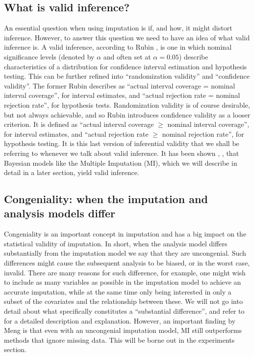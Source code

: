 \documentclass{article}
\begin{document}
	\subsection{What is valid inference?}
	An essential question when using imputation is if, and how, it might distort inference. However, to answer this question we need to have an idea of what valid inference is. A valid inference, according to Rubin \cite{rubin_multiple_1996}, is one in which nominal significance levels (denoted by $\alpha$ and often set at $\alpha = 0.05$) describe characteristics of a distribution for confidence interval estimation and hypothesis testing. This can be further refined into \enquote{randomization validity} and \enquote{confidence validity}. The former Rubin describes as \enquote{actual interval coverage = nominal interval coverage}, for interval estimates, and  \enquote{actual rejection rate = nominal rejection rate}, for hypothesis tests. Randomization validity is of course desirable, but not always achievable, and so Rubin introduces confidence validity as a looser criterion. It is defined as \enquote{actual interval coverage $\geq$ nominal interval coverage}, for interval estimates, and \enquote{actual rejection rate $\geq$ nominal rejection rate}, for hypothesis testing. It is this last version of inferential validity that we shall be referring to whenever we talk about valid inference. It has been shown \cite{Xie2017}, \cite{Meng1994}, \cite{rubin_multiple_1996} that Bayesian models like the Multiple Imputation (MI), which we will describe in detail in a later section, yield valid inference.
	
	\subsection{Congeniality: when the imputation and analysis models differ}
	Congeniality is an important concept in imputation and has a big impact on the statistical validity of imputation. In short, when the analysis model differs substantially from the imputation model we say that they are uncongenial. Such differences might cause the subsequent analysis to be biased, or in the worst case, invalid. There are many reasons for such difference, for example, one might wish to include as many variables as possible in the imputation model to achieve an accurate imputation, while at the same time only being interested in only a subset of the covariates and the relationship between these. We will not go into detail about what specifically constitutes a \enquote{substantial difference}, and refer to \cite{Meng1994} for a detailed description and explanation. However, an important finding by Meng is that even with an uncongenial imputation model, MI still outperforms methods that ignore missing data. This will be borne out in the experiments section.
	
\end{document}
